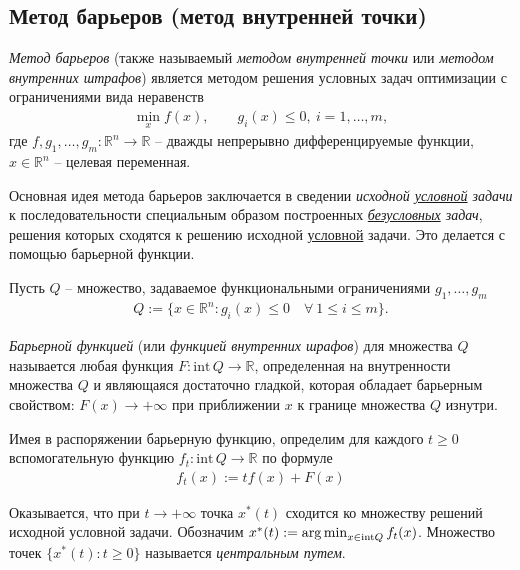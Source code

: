 \documentclass[%
	11pt,
	a4paper,
	utf8,
		]{article}
\begin{document}
\subsection{Метод барьеров (метод внутренней точки)}

\emph{Метод барьеров} (также называемый \emph{методом внутренней точки} или \emph{методом внутренних штрафов}) является методом решения условных задач оптимизации с ограничениями вида неравенств
\begin{align*}
	\min\limits_x f(x), \qquad g_i(x) \leqslant 0, \ i = 1, \ldots, m,
\end{align*}
где $ f, g_1, \ldots, g_m:\mathbb{R}^n \rightarrow \mathbb{R} $ -- дважды непрерывно дифференцируемые функции, $ x \in \mathbb{R}^n $ -- целевая переменная.

Основная идея метода барьеров заключается в сведении \emph{исходной \underline{условной} задачи} к последовательности специальным образом построенных \emph{\underline{безусловных} задач}, решения которых сходятся к решению исходной \underline{условной} задачи. Это делается с помощью барьерной функции.

Пусть $ Q $ -- множество, задаваемое функциональными ограничениями $ g_1, \ldots, g_m $
\begin{align*}
	Q := \{ x \in \mathbb{R}^n: g_i (x) \leqslant 0 \quad \forall \ 1 \leqslant i \leqslant m \}.
\end{align*}

\emph{Барьерной функцией} (или \emph{функцией внутренних шрафов}) для множества $ Q $ называется любая функция $ F: \text{int} \, Q \rightarrow \mathbb{R} $, определенная на внутренности множества $ Q $ и являющаяся достаточно гладкой, которая обладает барьерным свойством: $ F(x) \rightarrow + \infty $ при приближении $ x $ к границе множества $ Q $ изнутри.

Имея в распоряжении барьерную функцию, определим для каждого $ t \geqslant 0 $ вспомогательную функцию $ f_t: \text{int} \, Q \rightarrow \mathbb{R} $ по формуле
\begin{align*}
	f_t(x) := t f(x) + F(x)
\end{align*}

Оказывается, что при $ t \rightarrow + \infty $ точка $ x^{*}(t) $ сходится ко множеству решений исходной условной задачи. Обозначим $ x^{*}(t) := \operatorname*{arg\,min}_{ x \in \text{int} Q } f_t(x) $. Множество точек $ \{ x^{*}(t): t \geqslant 0 \} $ называется \emph{центральным путем}.
\end{document}
